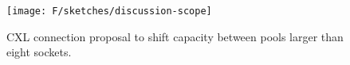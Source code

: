 
\def \vmina {\vspace{-0.1in}}
\def \vminb {\vspace{0.05in}}

\begin{figure}[t!]
\centering
\texttt{[image: F/sketches/discussion-scope]}
\vmina
\caption{CXL connection proposal to shift capacity between pools larger than eight sockets.}
\label{fig-discussion-scope}

\vminb

\end{figure}


